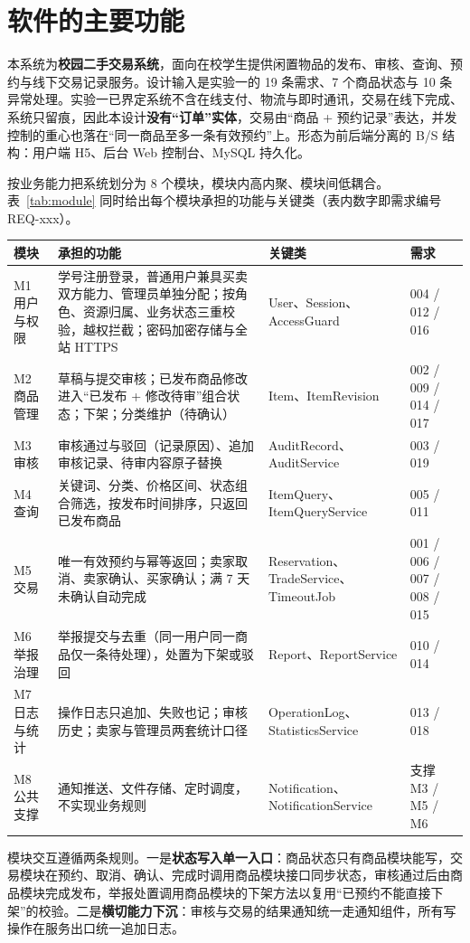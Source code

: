 \section{软件的主要功能}

本系统为\textbf{校园二手交易系统}，面向在校学生提供闲置物品的发布、审核、查询、预约与线下交易记录服务。设计输入是实验一的 19 条需求、7 个商品状态与 10 条异常处理。实验一已界定系统不含在线支付、物流与即时通讯，交易在线下完成、系统只留痕，因此本设计\textbf{没有“订单”实体}，交易由“商品 + 预约记录”表达，并发控制的重心也落在“同一商品至多一条有效预约”上。形态为前后端分离的 B/S 结构：用户端 H5、后台 Web 控制台、MySQL 持久化。

按业务能力把系统划分为 8 个模块，模块内高内聚、模块间低耦合。表~\ref{tab:module} 同时给出每个模块承担的功能与关键类（表内数字即需求编号 REQ-xxx）。

\begin{center}
\label{tab:module}
\renewcommand{\arraystretch}{1.15}
\begin{tabularx}{\textwidth}{@{}p{2.2cm}Y>{\raggedright\arraybackslash}p{4.2cm}p{2.25cm}@{}}
\toprule
模块 & 承担的功能 & 关键类 & 需求 \\
\midrule
M1 用户与权限 & 学号注册登录，普通用户兼具买卖双方能力、管理员单独分配；按角色、资源归属、业务状态三重校验，越权拦截；密码加密存储与全站 HTTPS & User、Session、AccessGuard & 004 / 012 / 016 \\
M2 商品管理 & 草稿与提交审核；已发布商品修改进入“已发布 + 修改待审”组合状态；下架；分类维护（待确认） & Item、ItemRevision & 002 / 009 / 014 / 017 \\
M3 审核 & 审核通过与驳回（记录原因）、追加审核记录、待审内容原子替换 & AuditRecord、AuditService & 003 / 019 \\
M4 查询 & 关键词、分类、价格区间、状态组合筛选，按发布时间排序，只返回已发布商品 & ItemQuery、ItemQueryService & 005 / 011 \\
M5 交易 & 唯一有效预约与幂等返回；卖家取消、卖家确认、买家确认；满 7 天未确认自动完成 & Reservation、TradeService、TimeoutJob & 001 / 006 / 007 / 008 / 015 \\
M6 举报治理 & 举报提交与去重（同一用户同一商品仅一条待处理），处置为下架或驳回 & Report、ReportService & 010 / 014 \\
M7 日志与统计 & 操作日志只追加、失败也记；审核历史；卖家与管理员两套统计口径 & OperationLog、StatisticsService & 013 / 018 \\
M8 公共支撑 & 通知推送、文件存储、定时调度，不实现业务规则 & Notification、NotificationService & 支撑 M3 / M5 / M6 \\
\bottomrule
\end{tabularx}
\end{center}

模块交互遵循两条规则。一是\textbf{状态写入单一入口}：商品状态只有商品模块能写，交易模块在预约、取消、确认、完成时调用商品模块接口同步状态，审核通过后由商品模块完成发布，举报处置调用商品模块的下架方法以复用“已预约不能直接下架”的校验。二是\textbf{横切能力下沉}：审核与交易的结果通知统一走通知组件，所有写操作在服务出口统一追加日志。
